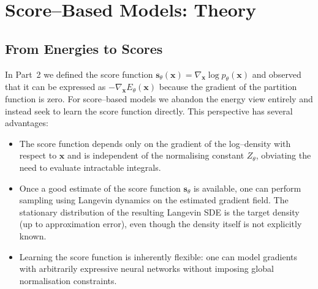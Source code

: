

\section{Score--Based Models: Theory}

\subsection{From Energies to Scores}

In Part~2 we defined the score function $\mathbf{s}_\theta(\mathbf{x}) =
\nabla_{\mathbf{x}} \log p_\theta(\mathbf{x})$ and observed that it can be
expressed as $-\nabla_{\mathbf{x}} E_\theta(\mathbf{x})$ because the gradient
of the partition function is zero.  For
score–based models we abandon the energy view entirely and instead seek to
learn the score function directly.  This perspective has several
advantages:

\begin{itemize}[leftmargin=*]
  \item The score function depends only on the gradient of the log–density
    with respect to $\mathbf{x}$ and is independent of the normalising
    constant $Z_\theta$, obviating the need to evaluate intractable
    integrals.
  \item Once a good estimate of the score function $\mathbf{s}_\theta$ is
    available, one can perform sampling using Langevin dynamics on the
    estimated gradient field.  The stationary distribution of the resulting
    Langevin SDE is the target density (up to approximation error), even
    though the density itself is not explicitly known.
  \item Learning the score function is inherently flexible: one can model
    gradients with arbitrarily expressive neural networks without imposing
    global normalisation constraints.
\end{itemize}

